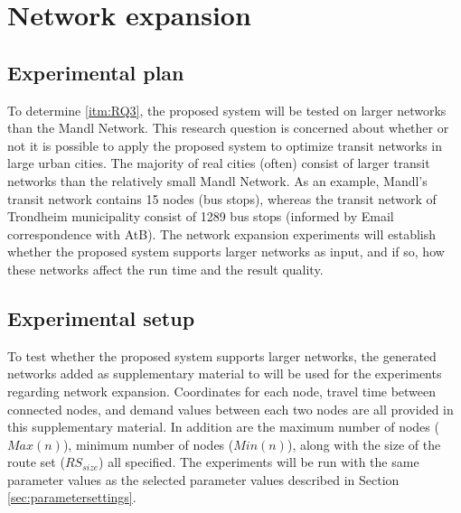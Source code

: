 \section{Network expansion}
\label{sec:networkExpansion}
\subsection{Experimental plan}
To determine \vref{itm:RQ3}, the proposed system will be tested on larger networks than the Mandl Network. This research question is concerned about whether or not it is possible to apply the proposed system to optimize transit networks in large urban cities. The majority of real cities (often) consist of larger transit networks than the relatively small Mandl Network. As an example, Mandl's transit network contains 15 nodes (bus stops), whereas the transit network of Trondheim municipality consist of 1289 bus stops (informed by Email correspondence with AtB\citep{website:atb}). The network expansion experiments will establish whether the proposed system supports larger networks as input, and if so, how these networks affect the run time and the result quality.



\subsection{Experimental setup}
\label{subsec:scalabilityExperiments_setup}

To test whether the proposed system supports larger networks, the generated networks added as supplementary material to \citet{mumford13} will be used for the experiments regarding network expansion. Coordinates for each node, travel time between connected nodes, and demand values between each two nodes are all provided in this supplementary material. In addition are the maximum number of nodes ($Max(n)$), minimum number of nodes ($Min(n)$), along with the size of the route set ($RS_{size}$) all specified. The experiments will be run with the same parameter values as the selected parameter values described in Section \vref{sec:parametersettings}.

